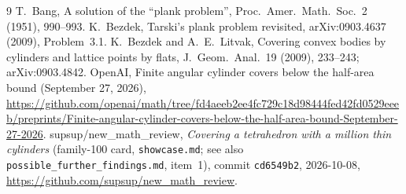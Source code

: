 \documentclass[11pt]{amsart}
\theoremstyle{remark}
\begin{document}
\begin{thebibliography}{9}
 T.~Bang, A solution of the ``plank problem'', Proc.\ Amer.\ Math.\ Soc.\ 2 (1951), 990--993.
 K.~Bezdek, Tarski's plank problem revisited, arXiv:0903.4637 (2009), Problem~3.1.
 K.~Bezdek and A.~E.~Litvak, Covering convex bodies by cylinders and lattice points by flats, J.\ Geom.\ Anal.\ 19 (2009), 233--243; arXiv:0903.4842.
 OpenAI, Finite angular cylinder covers below the half-area bound (September 27, 2026), \url{https://github.com/openai/math/tree/fd4aeeb2ee4fc729c18d98444fed42fd0529eeeb/preprints/Finite-angular-cylinder-covers-below-the-half-area-bound-September-27-2026}.
 supsup/new\_math\_review, \emph{Covering a tetrahedron with a million thin cylinders} (family-100 card, \texttt{showcase.md}; see also \texttt{possible\_further\_findings.md}, item~1), commit \texttt{cd6549b2}, 2026-10-08, \url{https://github.com/supsup/new_math_review}.
\end{thebibliography}
\end{document}
